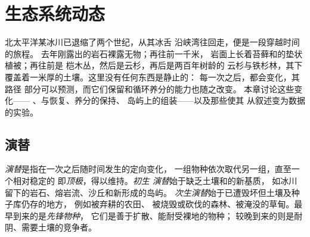 \chapter{生态系统动态}\label{ch:b1:ecosystem-dynamics}

北太平洋某冰川已退缩了两个世纪，从其冰舌
沿峡湾往回走，便是一段穿越时间的旅程。
去年刚露出的岩石裸露无物；再往前一千米，
岩面上长着苔藓和的垫状植被；再往前是
桤木丛，然后是云杉，再后是两百年树龄的
云杉与铁杉林，其下覆盖着一米厚的土壤。这里没有任何东西是静止的：
每一次之后，都会变化，其路径
部分可以预测，而它们保留和循环养分的能力也随之改变。
本章讨论这些变化——
、与恢复、养分的保持、
岛屿上的组装——以及那些使其
从叙述变为数据的实验。

\section{演替}

\begin{definition}[生态演替]\label{def:b1:ecosystem-dynamics:succession}
\emph{演替}是指在一次之后随时间发生的定向变化，
一组物种依次取代另一组，直至一个相对稳定的
即\emph{顶极}，得以维持。\emph{初生
演替}始于缺乏土壤和的新基质，
如冰川留下的岩石、熔岩流、沙丘和新形成的岛屿。
\emph{次生演替}始于已遭毁坏但土壤及种子库仍存的地方，
例如被弃耕的农田、
被烧毁或砍伐的森林、被淹没的草甸。最早到来的是\emph{先锋物种}，
它们是善于扩散、能耐受裸地的物种；
较晚到来的则是耐阴、需要土壤的竞争者。
\end{definition}

